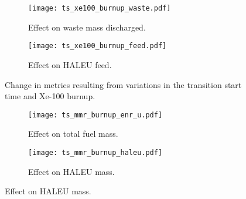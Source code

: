\begin{figure}
    \ContinuedFloat    
    \begin{subfigure}[b]{0.48\textwidth}
        \centering
        \texttt{[image: ts\_xe100\_burnup\_waste.pdf]}
        \caption{Effect on waste mass discharged.}
        \label{fig:ts_xe100_bu_waste}
    \end{subfigure}
    \hfill
    \begin{subfigure}[b]{0.48\textwidth}
        \centering
        \texttt{[image: ts\_xe100\_burnup\_feed.pdf]}
        \caption{Effect on HALEU feed.}
        \label{fig:ts_xe100_bu_feed}
    \end{subfigure}
    \caption{Change in metrics resulting from variations in the 
    transition start time and Xe-100 burnup.}
    \label{fig:ts_xe100_bu}
\end{figure}

\begin{figure}
    \begin{subfigure}[b]{0.48\textwidth}
        \centering
        \texttt{[image: ts\_mmr\_burnup\_enr\_u.pdf]}
        \caption{Effect on total fuel mass.}
        \label{fig:ts_mmr_bu_enr_u}
    \end{subfigure}
    \hfill
    \begin{subfigure}[b]{0.48\textwidth}
        \centering
        \texttt{[image: ts\_mmr\_burnup\_haleu.pdf]}
        \caption{Effect on HALEU mass.}
        \label{fig:ts_mmr_bu_haleu}
    \end{subfigure}
\end{figure}

